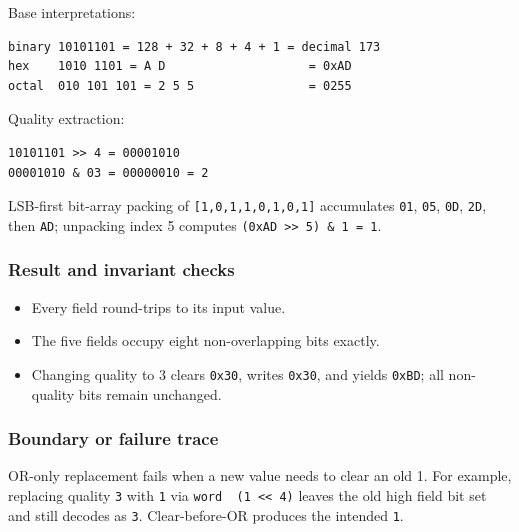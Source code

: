 Base interpretations:

\begin{verbatim}
binary 10101101 = 128 + 32 + 8 + 4 + 1 = decimal 173
hex    1010 1101 = A D                    = 0xAD
octal  010 101 101 = 2 5 5                = 0255
\end{verbatim}

Quality extraction:

\begin{verbatim}
10101101 >> 4 = 00001010
00001010 & 03 = 00000010 = 2
\end{verbatim}

LSB-first bit-array packing of \texttt{{[}1,0,1,1,0,1,0,1{]}} accumulates \texttt{01}, \texttt{05}, \texttt{0D}, \texttt{2D}, then \texttt{AD}; unpacking index 5 computes \texttt{(0xAD\ \textgreater{}\textgreater{}\ 5)\ \&\ 1\ =\ 1}.

\subsubsection{Result and invariant checks}\label{appendix-92ff77d4dfdc-result-and-invariant-checks}

\hypertarget{appendix-92ff77d4dfdc-result-and-invariant-checks}{}

\begin{itemize}
\tightlist
\item
  Every field round-trips to its input value.
\item
  The five fields occupy eight non-overlapping bits exactly.
\item
  Changing quality to 3 clears \texttt{0x30}, writes \texttt{0x30}, and yields \texttt{0xBD}; all non-quality bits remain unchanged.
\end{itemize}

\subsubsection{Boundary or failure trace}\label{appendix-92ff77d4dfdc-boundary-or-failure-trace}

\hypertarget{appendix-92ff77d4dfdc-boundary-or-failure-trace}{}

OR-only replacement fails when a new value needs to clear an old 1. For example, replacing quality \texttt{3} with \texttt{1} via \texttt{word\ \textbar{}\ (1\ \textless{}\textless{}\ 4)} leaves the old high field bit set and still decodes as \texttt{3}. Clear-before-OR produces the intended \texttt{1}.

